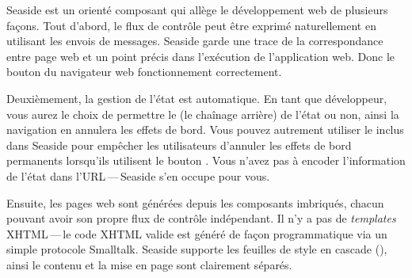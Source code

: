 \documentclass[a4paper,10pt,twoside]{book}
\begin{document}

Seaside est un \framework orienté composant
qui allège le développement web de plusieurs façons.
Tout d'abord, le flux de contrôle
peut être exprimé naturellement en utilisant les envois de messages.
Seaside garde une trace de la correspondance entre page web et 
un point précis dans l'exécution de l'application web.
Donc le bouton \backbtn du navigateur web fonctionnement correctement.

Deuxièmement, la gestion de l'état est automatique. %
En tant que développeur, vous aurez le choix de permettre le
\backtracking (\ie le chaînage arrière) de l'état ou non, ainsi la
navigation en \backbtn{} annulera les effets de bord.
Vous pouvez autrement utiliser le 
inclus dans Seaside pour empêcher les utilisateurs d'annuler les
effets de bord permanents lorsqu'ils utilisent le bouton \backbtn.
Vous n'avez pas à encoder l'information de l'état dans
l'URL\,---\,Seaside s'en occupe pour vous. 

Ensuite, les pages web sont générées depuis les composants imbriqués,
chacun pouvant avoir son propre flux de contrôle indépendant.
Il n'y a pas de \emph{templates} XHTML\,---\,le code XHTML valide est
généré de façon programmatique via un simple protocole Smalltalk.
Seaside supporte les feuilles de style en cascade 
 (), ainsi le contenu et la mise en page sont clairement
 séparés.
\end{document}

